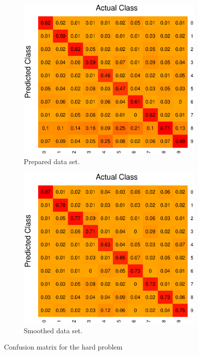 \begin{figure}[H]
\centering
\begin{subfigure}{0.45\textwidth}
\includegraphics[width=\textwidth]{graphics/tree_confusion_all}
\caption{Prepared data set.}
\end{subfigure}
\begin{subfigure}{0.45\textwidth}
\includegraphics[width=\textwidth]{graphics/tree_confusion_all2}
\caption{Smoothed data set.}
\end{subfigure}
\caption{Confusion matrix for the hard problem}
\label{fig:tree_confus_all}
\end{figure}